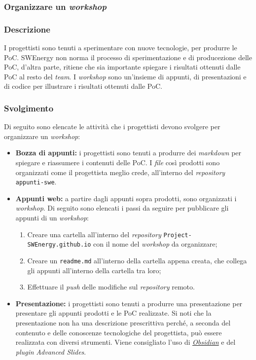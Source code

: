 \subsubsection{Organizzare un \textit{workshop}}

\subsubsection{Descrizione}

I progettisti sono tenuti a sperimentare con nuove tecnologie, per produrre le
PoC. SWEnergy non norma il processo di sperimentazione e di producezione delle
PoC, d'altra parte, ritiene che sia importante spiegare i risultati ottenuti
dalle PoC al resto del \textit{team}. I \textit{workshop} sono un'insieme di
appunti, di presentazioni e di codice per illustrare i risultati ottenuti dalle
PoC.

\subsubsection{Svolgimento}
Di seguito sono elencate le attività che i progettisti devono svolgere per
organizzare un \textit{workshop}:
\begin{itemize}
	\item \textbf{Bozza di appunti:} i progettisti sono tenuti a produrre dei
	      \textit{markdown} per spiegare e riassumere i contenuti delle PoC. I
	      \textit{file} così prodotti sono organizzati come il progettista
	      meglio crede, all'interno del \textit{repository}
	      \texttt{appunti-swe}.

	\item \textbf{Appunti web:} a partire dagli appunti sopra prodotti, sono
	      organizzati i \textit{workshop}. Di seguito sono elencati i passi da
	      seguire per pubblicare gli appunti di un \textit{workshop}:
	      \begin{enumerate}
		      \item Creare una cartella all'interno del \textit{repository}
		            \texttt{Project-SWEnergy.github.io} con il nome del
		            \textit{workshop} da organizzare;

		      \item Creare un \texttt{readme.md} all'interno della
		            cartella appena creata, che collega gli appunti all'interno
		            della cartella tra loro;

		      \item Effettuare il \textit{push} delle modifiche sul
		            \textit{repository} remoto.
	      \end{enumerate}

	\item \textbf{Presentazione:} i progettisti sono tenuti a produrre una
	      presentazione per presentare gli appunti prodotti e le PoC realizzate.
	      Si noti che la presentazione non ha una descrizione prescrittiva
	      perché, a seconda del contenuto e delle conoscenze tecnologiche del
	      progettista, può essere realizzata con diversi strumenti. Viene
	      consigliato l'uso di \href{https://obsidian.md/}{\textit{Obsidian}} e
	      del \textit{plugin} \textit{Advanced Slides}.
\end{itemize}

